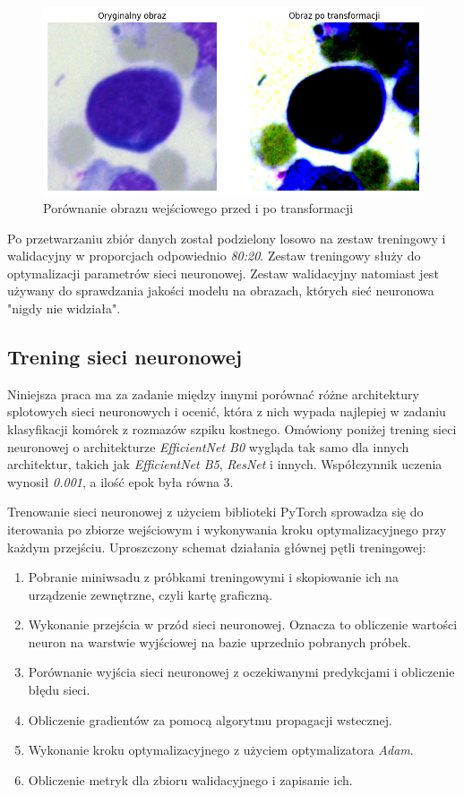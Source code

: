\begin{figure}
    \centering
    \includegraphics[width=\textwidth]{image_transform}
    \caption{Porównanie obrazu wejściowego przed i po transformacji}
    \label{fig:transformations_example}
\end{figure}

Po przetwarzaniu zbiór danych został podzielony losowo na zestaw treningowy i walidacyjny w proporcjach odpowiednio \textit{80:20}.
Zestaw treningowy służy do optymalizacji parametrów sieci neuronowej.
Zestaw walidacyjny natomiast jest używany do sprawdzania jakości modelu na obrazach, których sieć neuronowa "nigdy nie widziała".

\subsection{Trening sieci neuronowej}

Niniejsza praca ma za zadanie między innymi porównać różne architektury splotowych sieci neuronowych i ocenić,
która z nich wypada najlepiej w zadaniu klasyfikacji komórek z rozmazów szpiku kostnego.
Omówiony poniżej trening sieci neuronowej o architekturze \textit{EfficientNet B0} wygląda tak samo dla innych architektur, takich jak \textit{EfficientNet B5}, \textit{ResNet} i innych.
Współczynnik uczenia wynosił \textit{0.001}, a ilość epok była równa 3.

Trenowanie sieci neuronowej z użyciem biblioteki PyTorch sprowadza się do iterowania po zbiorze wejściowym i wykonywania kroku optymalizacyjnego przy każdym przejściu.
Uproszczony schemat działania głównej pętli treningowej:

\begin{enumerate}
    \item Pobranie miniwsadu z próbkami treningowymi i skopiowanie ich na urządzenie zewnętrzne, czyli kartę graficzną.
    \item Wykonanie przejścia w przód sieci neuronowej.
    Oznacza to obliczenie wartości neuron na warstwie wyjściowej na bazie uprzednio pobranych próbek.
    \item Porównanie wyjścia sieci neuronowej z oczekiwanymi predykcjami i obliczenie błędu sieci.
    \item Obliczenie gradientów za pomocą algorytmu propagacji wstecznej.
    \item Wykonanie kroku optymalizacyjnego z użyciem optymalizatora \textit{Adam}.
    \item Obliczenie metryk dla zbioru walidacyjnego i zapisanie ich.
\end{enumerate}

